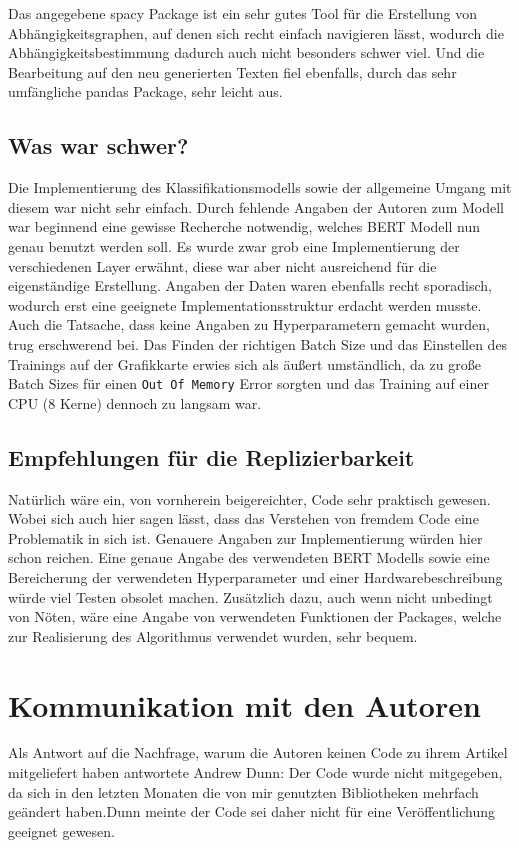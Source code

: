\documentclass[DIV=13,fontsize=11pt]{scrartcl}
\begin{document}
Das angegebene spacy Package ist ein sehr gutes Tool für die Erstellung von Abhängigkeitsgraphen, auf denen sich recht
einfach navigieren lässt, wodurch die Abhängigkeitsbestimmung dadurch auch nicht besonders schwer viel. Und die Bearbeitung
auf den neu generierten Texten fiel ebenfalls, durch das sehr umfängliche pandas Package, sehr leicht aus.

\subsection{Was war schwer?}
Die Implementierung des Klassifikationsmodells sowie der allgemeine Umgang mit diesem war nicht sehr einfach.
Durch fehlende Angaben der Autoren zum Modell war beginnend eine gewisse Recherche notwendig, welches BERT Modell nun genau
benutzt werden soll. Es wurde zwar grob eine Implementierung der verschiedenen Layer erwähnt, diese war aber nicht ausreichend
für die eigenständige Erstellung. Angaben der Daten waren ebenfalls recht sporadisch, wodurch erst eine geeignete Implementationsstruktur
erdacht werden musste. Auch die Tatsache, dass keine Angaben zu Hyperparametern gemacht wurden, trug erschwerend bei. Das Finden der richtigen
Batch Size und das Einstellen des Trainings auf der Grafikkarte erwies sich als äußert umständlich, da zu große Batch Sizes für einen
\texttt{Out Of Memory} Error sorgten und das Training auf einer CPU (8 Kerne) dennoch zu langsam war.

\subsection{Empfehlungen für die Replizierbarkeit}
Natürlich wäre ein, von vornherein beigereichter, Code sehr praktisch gewesen. Wobei sich auch hier sagen lässt, dass das Verstehen von
fremdem Code eine Problematik in sich ist. Genauere Angaben zur Implementierung würden hier schon reichen. Eine genaue Angabe des verwendeten
BERT Modells sowie eine Bereicherung der verwendeten Hyperparameter und einer Hardwarebeschreibung würde viel Testen obsolet machen.
Zusätzlich dazu, auch wenn nicht unbedingt von Nöten, wäre eine Angabe von verwendeten Funktionen der Packages, welche zur Realisierung
des Algorithmus verwendet wurden, sehr bequem.

\section{Kommunikation mit den Autoren}

Als Antwort auf die Nachfrage, warum die Autoren keinen Code zu ihrem Artikel mitgeliefert haben
antwortete Andrew Dunn: \glqq Der Code wurde nicht mitgegeben, da sich in den letzten Monaten die von mir genutzten
Bibliotheken mehrfach geändert haben.\grqq Dunn meinte der Code sei daher nicht für eine Veröffentlichung geeignet gewesen.\\
\end{document}
